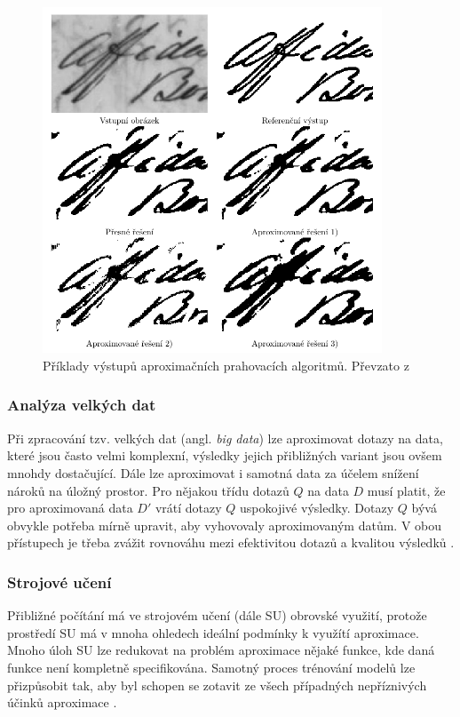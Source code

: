 \begin{figure}[H]
    \centering
    \includegraphics[width=0.9\textwidth]{obrazky-figures/approx_thresholding.png}
    \caption{Příklady výstupů aproximačních prahovacích algoritmů. Převzato z \cite{approx_image}}
    \label{fig:approx_threshold}
\end{figure}

\subsubsection{Analýza velkých dat}
Při zpracování tzv. velkých dat (angl. \textit{big data}) lze aproximovat dotazy na data, které jsou často velmi komplexní, výsledky jejich přibližných variant jsou ovšem mnohdy dostačující. Dále lze aproximovat i samotná data za účelem snížení nároků na úložný prostor. Pro nějakou třídu dotazů $Q$ na data $D$ musí platit, že pro aproximovaná data $D'$ vrátí dotazy $Q$ uspokojivé výsledky. Dotazy $Q$ bývá obvykle potřeba mírně upravit, aby vyhovovaly aproximovaným datům. V obou přístupech je třeba zvážit rovnováhu mezi efektivitou dotazů a kvalitou výsledků \cite{approx_big_data}.

\subsubsection{Strojové učení}
Přibližné počítání má ve strojovém učení (dále SU) obrovské využití, protože prostředí SU má v mnoha ohledech ideální podmínky k využítí aproximace. Mnoho úloh SU lze redukovat na problém aproximace nějaké funkce, kde daná funkce není kompletně specifikována. Samotný proces trénování modelů lze přizpůsobit tak, aby byl schopen se zotavit ze všech případných nepříznivých účinků aproximace \cite{approx_ai}.


